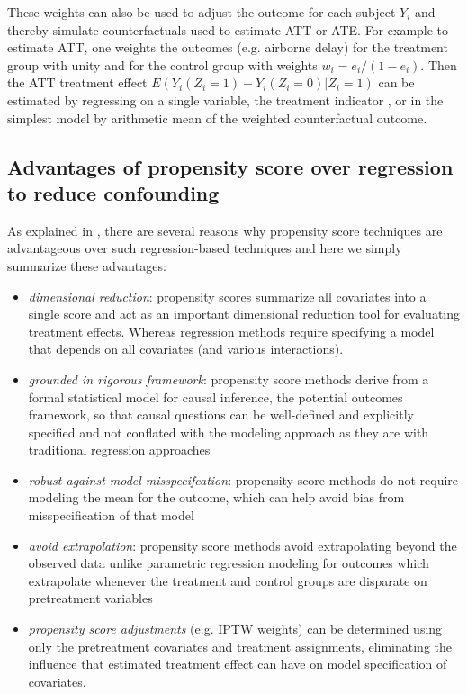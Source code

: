 \documentclass[conference]{IEEEtran}
\begin{document}
These weights can also be used to adjust the outcome for each subject $Y_i$ and thereby simulate counterfactuals used to estimate ATT or ATE.  For example to estimate ATT, one weights the outcomes (e.g. airborne delay) for the treatment group with unity and for the control group with weights $w_i=e_i/(1-e_i)$.  Then the ATT treatment effect $E(Y_i(Z_i=1)-Y_i(Z_i=0)|Z_i=1)$ can be estimated by regressing on a single variable, the treatment indicator \cite{ridgeway2015toolkit}, or in the simplest model by arithmetic mean of the weighted counterfactual outcome.  


\subsection{Advantages of propensity score over regression to reduce confounding}
As explained in \cite{mccaffrey2013tutorial}, there are several reasons why propensity score techniques are advantageous over such regression-based techniques and here we simply summarize these advantages:

\begin{itemize}
\item \emph{dimensional reduction}: propensity scores summarize all covariates into a single score and act as an important dimensional reduction tool for evaluating treatment effects. Whereas regression methods require specifying a model that depends on all covariates (and various interactions).

\item  \emph{grounded in rigorous framework}: propensity score methods derive from a formal statistical model for causal inference, the potential outcomes framework, so that causal questions can be well-defined and explicitly specified and not conflated with the modeling approach as they are with traditional regression approaches

\item  \emph{robust against model misspecifcation}: propensity score methods do not require modeling the mean for the outcome, which can help avoid bias from misspecification of that model 

\item \emph{avoid extrapolation}: propensity score methods avoid extrapolating beyond the observed data unlike parametric regression modeling for outcomes which extrapolate whenever the treatment and control groups are disparate on pretreatment variables

\item \emph{propensity score adjustments} (e.g. IPTW weights) can be determined using only the pretreatment covariates and treatment assignments, eliminating the influence that estimated treatment effect can have on model specification of covariates.
\end{itemize}
\end{document}
